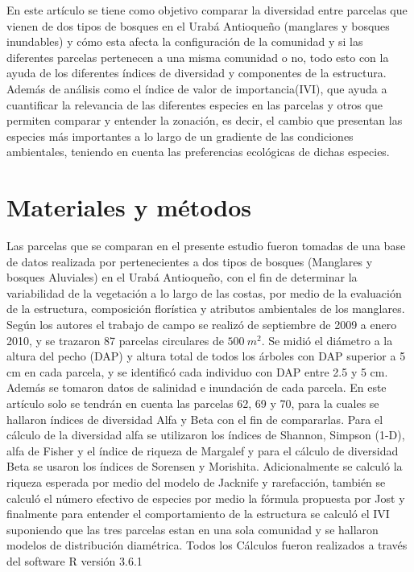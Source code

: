 \documentclass[conference,final,12pt,]{IEEEtran}
\begin{document}
En este artículo se tiene como objetivo comparar la diversidad entre
parcelas que vienen de dos tipos de bosques en el Urabá Antioqueño
(manglares y bosques inundables) y cómo esta afecta la configuración de
la comunidad y si las diferentes parcelas pertenecen a una misma
comunidad o no, todo esto con la ayuda de los diferentes índices de
diversidad y componentes de la estructura. Además de análisis como el
índice de valor de importancia(IVI), que ayuda a cuantificar la
relevancia de las diferentes especies en las parcelas y otros que
permiten comparar y entender la zonación, es decir, el cambio que
presentan las especies más importantes a lo largo de un gradiente de las
condiciones ambientales, teniendo en cuenta las preferencias ecológicas
de dichas especies.

\hypertarget{materiales-y-muxe9todos}{%
\section{Materiales y métodos}\label{materiales-y-muxe9todos}}

Las parcelas que se comparan en el presente estudio fueron tomadas de
una base de datos realizada por \citep{AB} pertenecientes a dos tipos de
bosques (Manglares y bosques Aluviales) en el Urabá Antioqueño, con el
fin de determinar la variabilidad de la vegetación a lo largo de las
costas, por medio de la evaluación de la estructura, composición
florística y atributos ambientales de los manglares. Según los autores
el trabajo de campo se realizó de septiembre de 2009 a enero 2010, y se
trazaron 87 parcelas circulares de \(500 \ m^2\). Se midió el diámetro a la
altura del pecho (DAP) y altura total de todos los árboles con DAP
superior a 5 cm en cada parcela, y se identificó cada individuo con DAP
entre 2.5 y 5 cm. Además se tomaron datos de salinidad e inundación de
cada parcela. En este artículo solo se tendrán en cuenta las parcelas
62, 69 y 70, para la cuales se hallaron índices de diversidad Alfa y
Beta con el fin de compararlas. Para el cálculo de la diversidad alfa se
utilizaron los índices de Shannon, Simpson (1-D), alfa de Fisher y el
índice de riqueza de Margalef y para el cálculo de diversidad Beta se
usaron los índices de Sorensen y Morishita. Adicionalmente se calculó la
riqueza esperada por medio del modelo de Jacknife y rarefacción, también
se calculó el número efectivo de especies por medio la fórmula propuesta
por Jost y finalmente para entender el comportamiento de la estructura
se calculó el IVI suponiendo que las tres parcelas estan en una sola comunidad y
se hallaron modelos de distribución diamétrica. Todos los Cálculos
fueron realizados a través del software R versión 3.6.1
\end{document}
